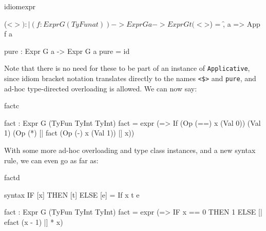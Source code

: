 \begin{SaveVerbatim}{idiomexpr}

(<$>) : |(f : Expr G (TyFun a t)) -> Expr G a -> Expr G t
(<$>) = \f, a => App f a

pure : Expr G a -> Expr G a
pure = id

\end{SaveVerbatim}

\noindent
Note that there is no need for these to be part of an instance of \texttt{Applicative},
since idiom bracket notation translates directly to the names \texttt{<\$>} and
\texttt{pure}, and ad-hoc type-directed overloading is allowed. We can now say:

\begin{SaveVerbatim}{factc}

fact : Expr G (TyFun TyInt TyInt)
fact = expr (\x => If (Op (==) x (Val 0))
                      (Val 1) (Op (*) [| fact (Op (-) x (Val 1)) |] x))

\end{SaveVerbatim}

\noindent
With some more ad-hoc overloading and type class instances, and a new
syntax rule, we can even go as far as:

\begin{SaveVerbatim}{factd}

syntax IF [x] THEN [t] ELSE [e] = If x t e

fact : Expr G (TyFun TyInt TyInt)
fact = expr (\x => IF x == 0 THEN 1 ELSE [| efact (x - 1) |] * x)

\end{SaveVerbatim}

